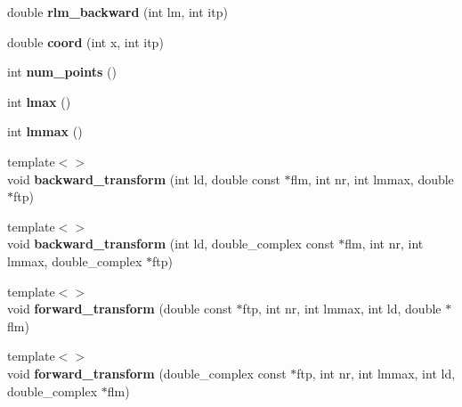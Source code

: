 \begin{DoxyCompactItemize}
\item 
\hypertarget{classsirius_1_1_s_h_t_ad17d7f35deca566287734c1c133a14ef}{}double {\bfseries rlm\+\_\+backward} (int lm, int itp)\label{classsirius_1_1_s_h_t_ad17d7f35deca566287734c1c133a14ef}

\item 
\hypertarget{classsirius_1_1_s_h_t_a41d5189b9068181c0d8a6537ca2f87a4}{}double {\bfseries coord} (int x, int itp)\label{classsirius_1_1_s_h_t_a41d5189b9068181c0d8a6537ca2f87a4}

\item 
\hypertarget{classsirius_1_1_s_h_t_a393a509bdee97d6319f1f74d90c9fab8}{}int {\bfseries num\+\_\+points} ()\label{classsirius_1_1_s_h_t_a393a509bdee97d6319f1f74d90c9fab8}

\item 
\hypertarget{classsirius_1_1_s_h_t_a4a7d53f07d838bdeadfe46e59423db3d}{}int {\bfseries lmax} ()\label{classsirius_1_1_s_h_t_a4a7d53f07d838bdeadfe46e59423db3d}

\item 
\hypertarget{classsirius_1_1_s_h_t_aea9cf6dfd52fcac352292bd1f47fcadb}{}int {\bfseries lmmax} ()\label{classsirius_1_1_s_h_t_aea9cf6dfd52fcac352292bd1f47fcadb}

\item 
\hypertarget{classsirius_1_1_s_h_t_a0d4c8d81247f516d7930170587b21298}{}{\footnotesize template$<$$>$ }\\void {\bfseries backward\+\_\+transform} (int ld, double const $\ast$flm, int nr, int lmmax, double $\ast$ftp)\label{classsirius_1_1_s_h_t_a0d4c8d81247f516d7930170587b21298}

\item 
\hypertarget{classsirius_1_1_s_h_t_a784cf7ea767f214db8f2e4a5891f5dea}{}{\footnotesize template$<$$>$ }\\void {\bfseries backward\+\_\+transform} (int ld, double\+\_\+complex const $\ast$flm, int nr, int lmmax, double\+\_\+complex $\ast$ftp)\label{classsirius_1_1_s_h_t_a784cf7ea767f214db8f2e4a5891f5dea}

\item 
\hypertarget{classsirius_1_1_s_h_t_ac266b2d5ceba113594c09d1d0c82374c}{}{\footnotesize template$<$$>$ }\\void {\bfseries forward\+\_\+transform} (double const $\ast$ftp, int nr, int lmmax, int ld, double $\ast$flm)\label{classsirius_1_1_s_h_t_ac266b2d5ceba113594c09d1d0c82374c}

\item 
\hypertarget{classsirius_1_1_s_h_t_a9827a3a731b0da23cc6857dfa0ec2481}{}{\footnotesize template$<$$>$ }\\void {\bfseries forward\+\_\+transform} (double\+\_\+complex const $\ast$ftp, int nr, int lmmax, int ld, double\+\_\+complex $\ast$flm)\label{classsirius_1_1_s_h_t_a9827a3a731b0da23cc6857dfa0ec2481}

\end{DoxyCompactItemize}
